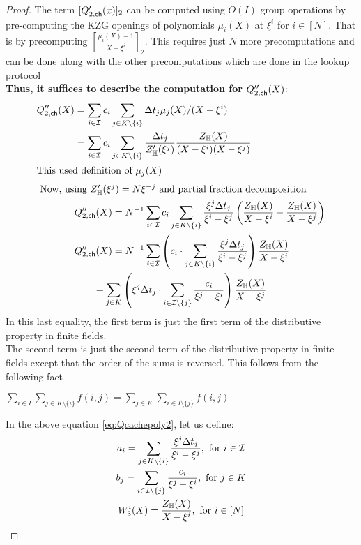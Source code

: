 \begin{proof}
    The term $[Q'_{2,\mathsf{ch}}({x})]_2$ can be computed using $O(I)$ group operations by pre-computing the
    \textsf{KZG} openings of polynomials $\mu_i(X)$ at $\xi^i$ for $i\in [N]$. That is by precomputing $[\frac{\mu_i(X)-1}{X-\xi^i}]_2$. This requires just $N$ more precomputations and can be done along with the other precomputations which are done in the lookup protocol\\

    \textbf{Thus, it suffices to describe the computation for $Q''_{2,\mathsf{ch}}({X})$}:
    \begin{align}\label{eq:Qcachepoly2}
    Q''_{2,\mathsf{ch}}({X}) &= \sum_{i\in \mathcal{I}}c_i\sum_{j\in K\setminus \{i\}} \Delta t_j\mu_j(X)/(X-\xi^i) \nonumber \\
    &= \sum_{i\in\mathcal{I}}c_i\sum_{j\in K\setminus \{i\}}\frac{\Delta t_j}{Z_{\mathbb{H}}'(\xi^j)} \frac{Z_{\mathbb{H}}(X)}{(X-\xi^i)(X-\xi^j)} \nonumber \\
    \intertext{This used definition of $\mu_j(X)$}
    \intertext{ Now, using $Z_{\mathbb{H}}'(\xi^j)=N\xi^{-j}$ and partial fraction decomposition}
    &Q''_{2,\mathsf{ch}}({X})= N^{-1}\sum_{i\in\mathcal{I}}c_i\sum_{j\in K\setminus \{i\}}\frac{\xi^j\Delta t_j}{\xi^i-\xi^j}
    \left(\frac{Z_{\mathbb{H}}(X)}{X-\xi^i} - \frac{Z_{\mathbb{H}}(X)}{X-\xi^j}\right) \nonumber \\
    &Q''_{2,\mathsf{ch}}({X})= N^{-1}\sum_{i\in\mathcal{I}}\left(c_i\cdot \sum_{j\in K\setminus \{i\}} \frac{\xi^j\Delta t_j}{\xi^i-\xi^j}\right)\frac{Z_{\mathbb{H}}(X)}{X-\xi^i} \nonumber \\
    &\qquad + \sum_{j\in K}\left(\xi^j\Delta t_j\cdot \sum_{i\in \mathcal{I}\setminus \{j\}}\frac{c_i}{\xi^j-\xi^i}\right)\frac{Z_{\mathbb{H}}(X)}{X-\xi^j}
    \end{align}
    In this last equality, the first term is just the first term of the distributive property in finite fields.\\
    The second term is just the second term of the distributive property in finite fields except that the order of the sums is reversed. This follows from the following fact \\

    \begin{fact}
        $\sum_{i \in I} \sum_{j \in K \setminus \{i\}} f(i,j)=\sum_{j \in K} \sum_{i \in I \setminus \{j\}} f(i,j) $
    \end{fact}

    In the above equation \eqref{eq:Qcachepoly2}, let us define:
    \begin{gather*}
        a_i = \sum_{j\in K\setminus \{i\}}\frac{\xi^j\Delta t_j}{\xi^i-\xi^j}, \text{ for } i\in \mathcal{I} \\
        b_j=  \sum_{i\in \mathcal{I}\setminus \{j\}}\frac{c_i}{\xi^j - \xi^i}, \text{ for } j\in K \\
        W_3^i(X) = \frac{Z_{\mathbb{H}}(X)}{X-\xi^i}, \text{ for } i\in [N]
    \end{gather*}



\end{proof}
